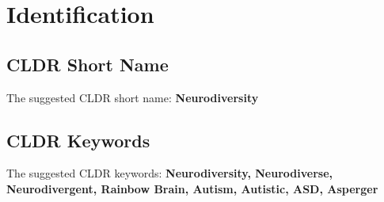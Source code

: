 \section{Identification}

\subsection{CLDR Short Name}
The suggested CLDR short name: \textbf{Neurodiversity}

\subsection{CLDR Keywords}
The suggested CLDR keywords: \textbf{Neurodiversity, Neurodiverse, Neurodivergent, Rainbow Brain, Autism, Autistic, ASD, Asperger}
